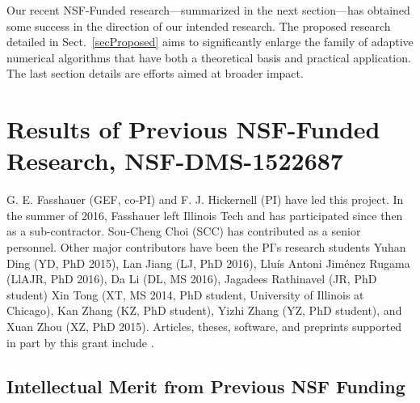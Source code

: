 \documentclass[11pt]{NSFamsart}
\begin{document}
Our recent NSF-Funded research---summarized in the next section---has obtained some success in 
the direction of our intended research.  The proposed research detailed 
in Sect.\ \ref{secProposed} aims to significantly enlarge the family of adaptive numerical 
algorithms that have both a theoretical basis and practical application.  The last section details are 
efforts aimed at broader impact.

\section{Results of Previous NSF-Funded Research,
NSF-DMS-1522687} \label{SectPrevious}

G. E. Fasshauer (GEF, co-PI) and F. J. Hickernell (PI) have led this project.  In the summer of 
2016, Fasshauer left Illinois Tech and has participated since then as a sub-contractor.  
Sou-Cheng Choi (SCC) has contributed as a senior personnel.  Other major contributors 
have been the PI's research students Yuhan Ding (YD, PhD 2015), Lan Jiang (LJ, PhD 2016), 
Llu\'is Antoni Jim\'enez Rugama (LlAJR, PhD 2016), Da Li (DL, MS 2016), Jagadees Rathinavel (JR, 
PhD student)
Xin Tong (XT, MS 2014, PhD student, University of Illinois at Chicago), Kan Zhang (KZ, PhD 
student), Yizhi Zhang (YZ, PhD student), and Xuan Zhou (XZ, PhD 2015).  Articles, theses,  
software, and preprints supported in 
part by this 
grant 
include 
\cite{ala_augmented_2017, 
	ChoEtal17a,
	ChoEtal17b,
	Din15a, 
	GilEtal16a,
	GilJim16b,
	Hic17a,
	HicJim16a,
	HicEtal18a,
	HicEtal17a,
	JimHic16a,
	JohFasHic18a,
	Li16a,
	Liu17a,
	mccourt_stable_2017,
	mishra_hybrid_nodate,
	mishra_stable_nodate, 
	rashidinia_stable_nodate,
	vu_rbf-fd_nodate,
	Zha17a,
	Zho15a,
	ZhoHic15a}.


\subsection{Intellectual Merit from Previous NSF Funding}
\label{previousmeritsubsec}
\end{document}
